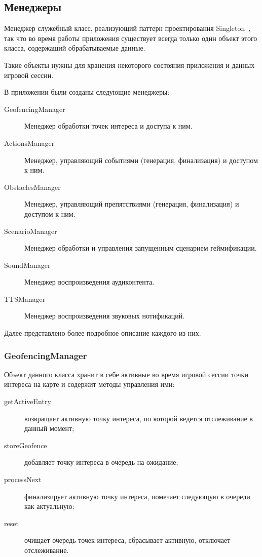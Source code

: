 \subsection*{Менеджеры}
Менеджер \textemdash\space служебный класс, реализующий паттерн проектирования Singleton~\autocite{singleton}, так что во время работы приложения существует всегда только один объект этого класса, содержащий обрабатываемые данные.

Такие объекты нужны для хранения некоторого состояния приложения и данных игровой сессии.

В приложении были созданы следующие менеджеры:
\begin{description}
	\item[GeofencingManager] Менеджер обработки точек интереса и доступа к ним.
	\item[ActionsManager] Менеджер, управляющий событиями (генерация, финализация) и доступом к ним.
	\item[ObstaclesManager] Менеджер, управляющий препятствиями (генерация, финализация) и доступом к ним.
	\item[ScenarioManager] Менеджер обработки и управления запущенным сценарием геймификации.
	\item[SoundManager] Менеджер воспроизведения аудиконтента.
	\item[TTSManager] Менеджер воспроизведения звуковых нотификаций.
\end{description}
\smallskip
Далее представлено более подробное описание каждого из них.

\subsubsection*{GeofencingManager}
\label{subsubsec:geofencing_manager}
Объект данного класса хранит в себе активные во время игровой сессии точки интереса на карте и содержит методы управления ими:
\begin{description}
	\item[getActiveEntry] возвращает активную точку интереса, по которой ведется отслеживание в данный момент;
	\item[storeGeofence] добавляет точку интереса в очередь на ожидание;
	\item[processNext] финализирует активную точку интереса, помечает следующую в очереди как актуальную;
	\item[reset] очищает очередь точек интереса, сбрасывает активную, отключает отслеживание.
\end{description}

